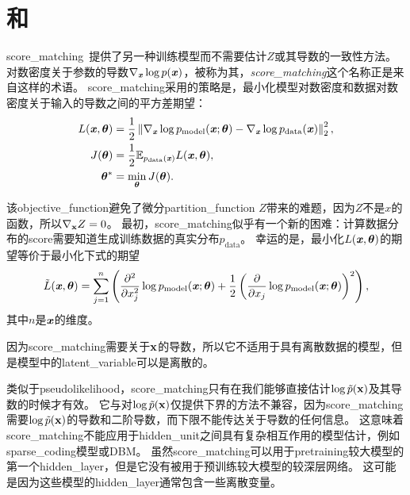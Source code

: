 \section{和}
\label{sec:score_matching_and_ratio_matching}
\gls{score_matching}~\citep{Hyvarinen-2005-small}提供了另一种训练模型而不需要估计$Z$或其导数的一致性方法。
对数密度关于参数的导数$\nabla_{\boldsymbol{\mathit{x}}} \log p(\boldsymbol{\mathit{x}})$，被称为其，\emph{\gls{score_matching}}这个名称正是来自这样的术语。
\gls{score_matching}采用的策略是，最小化模型对数密度和数据对数密度关于输入的导数之间的平方差期望：
\begin{align}
	L(\boldsymbol{\mathit{x}}, \boldsymbol{\theta}) & = \frac{1}{2} \left\lVert  \nabla_{\boldsymbol{\mathit{x}}} \log p_{\text{model}}(\boldsymbol{\mathit{x}}; \boldsymbol{\theta}) - \nabla_{\boldsymbol{\mathit{x}}} \log p_{\text{data}} (\boldsymbol{\mathit{x}})  \right\rVert_2^2, \\
	J(\boldsymbol{\theta}) & = \frac{1}{2} \mathbb{E}_{p_{\text{data}}(\boldsymbol{\mathit{x}})}  L(\boldsymbol{\mathit{x}}, \boldsymbol{\theta}), \\
	\boldsymbol{\theta}^* & = \min_{\boldsymbol{\theta}} J(\boldsymbol{\theta}) . \\
\end{align}


该\gls{objective_function}避免了微分\gls{partition_function} $Z$带来的难题，因为$Z$不是$x$的函数，所以$\nabla_{\mathbf{x}} Z = 0$。
最初，\gls{score_matching}似乎有一个新的困难：计算数据分布的\gls{score}需要知道生成训练数据的真实分布$p_{\text{data}}$。
幸运的是，最小化$L(\boldsymbol{\mathit{x}}, \boldsymbol{\theta})$的期望等价于最小化下式的期望
\begin{equation}
	\tilde{L} (\boldsymbol{\mathit{x}}, \boldsymbol{\theta}) = \sum_{j=1}^n \left( \frac{\partial^2}{ \partial x_j^2 } 
	\log p_{\text{model}} (\boldsymbol{\mathit{x}}; \boldsymbol{\theta}) + \frac{1}{2} \left( \frac{\partial}{ \partial x_j }
	\log p_{\text{model}} (\boldsymbol{\mathit{x}}; \boldsymbol{\theta})
  \right)^2
\right),
\end{equation}
其中$n$是$\boldsymbol{\mathit{x}}$的维度。


因为\gls{score_matching}需要关于$\mathbf{x}$的导数，所以它不适用于具有离散数据的模型，但是模型中的\gls{latent_variable}可以是离散的。


类似于\gls{pseudolikelihood}，\gls{score_matching}只有在我们能够直接估计$\log \tilde{p}(\mathbf{x})$及其导数的时候才有效。
它与对$\log \tilde{p}(\mathbf{x})$仅提供下界的方法不兼容，因为\gls{score_matching}需要$\log \tilde{p}(\mathbf{x})$的导数和二阶导数，而下限不能传达关于导数的任何信息。
这意味着\gls{score_matching}不能应用于\gls{hidden_unit}之间具有复杂相互作用的模型估计，例如\gls{sparse_coding}模型或\gls{DBM}。
虽然\gls{score_matching}可以用于\gls{pretraining}较大模型的第一个\gls{hidden_layer}，但是它没有被用于预训练较大模型的较深层网络。
这可能是因为这些模型的\gls{hidden_layer}通常包含一些离散变量。



